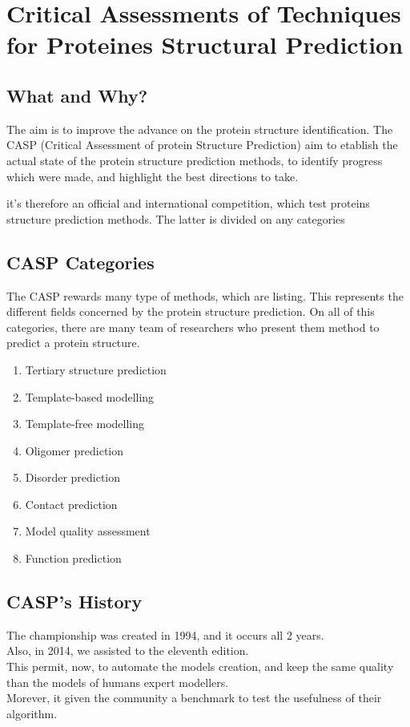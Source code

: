 \section{Critical Assessments  of Techniques  for Proteines Structural Prediction}
\subsection{What and Why?}

The aim is to improve the advance on the protein structure identification. 
The CASP (Critical Assessment of protein Structure Prediction) aim to etablish the actual state of the protein structure prediction methods, to identify progress which were made, and highlight the best directions to take.

it's therefore an official and international competition, which test proteins structure prediction methods. The latter is divided on any categories

\subsection{CASP Categories}

   The CASP rewards many type of methods, which are listing.
   This represents the different fields concerned by the protein structure prediction. On all of this categories, there are many team of researchers who present them method to predict a protein structure.

\begin{enumerate}
   \item Tertiary structure prediction
   \item Template-based modelling
   \item Template-free modelling
   \item Oligomer prediction
   \item Disorder prediction
   \item Contact prediction
   \item Model quality assessment
   \item Function prediction
\end{enumerate}

\subsection{CASP's History}
   The championship was created in 1994, and it occurs all 2 years.\\
   Also, in 2014, we assisted to the eleventh edition.\\

   This permit, now, to automate the models creation, and keep the same quality than the models of humans expert modellers.\\
   Morever, it given the community a benchmark to test the usefulness of their algorithm.\\
